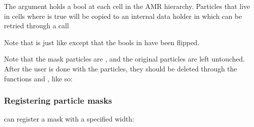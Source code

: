 \documentclass[letterpaper,10pt,english]{sphinxmanual}
\begin{document}
The argument  holds a bool at each cell in the AMR hierarchy.
Particles that live in cells where  is true will be copied to an internal data holder in  which can be retried through a call

\begin{sphinxVerbatim}[commandchars=\\\{\},formatcom=\scriptsize]
   
\end{sphinxVerbatim}

Note that  is just like  except that the bools in  have been flipped.

Note that the mask particles are , and the original particles are left untouched.
After the user is done with the particles, they should be deleted through the functions  and , like so:

\begin{sphinxVerbatim}[commandchars=\\\{\},formatcom=\scriptsize]
 
 


   

\end{sphinxVerbatim}


\subsubsection{Registering particle masks}
\label{\detokenize{Source/Particles:registering-particle-masks}}
 can register a  mask with a specified width:
\end{document}
